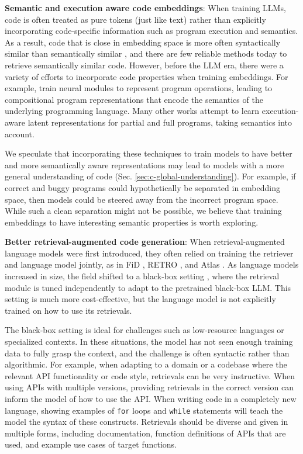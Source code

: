 \textbf{Semantic and execution aware code embeddings}: When training LLMs, code is often treated as pure tokens (just like text) rather than explicitly incorporating code-specific information such as program execution and semantics. As a result, code that is close in embedding space is more often syntactically similar than semantically similar \citep{utpala2023language, zhao2023get}, and there are few reliable methods today to retrieve semantically similar code. However, before the LLM era, there were a variety of efforts to incorporate code properties when training embeddings. For example, \citet{nye2020representing} train neural modules to represent program operations, leading to compositional program representations that encode the semantics of the underlying programming language. Many other works \citep{zohar2018automatic, ellis2019write, chen2021latent} attempt to learn execution-aware latent representations for partial and full programs, taking semantics into account. 

We speculate that incorporating these techniques to train models to have better and more semantically aware representations may lead to models with a more general understanding of code (Sec. \ref{sec:c-global-understanding}). For example, if correct and buggy programs could hypothetically be separated in embedding space, then models could be steered away from the incorrect program space. While such a clean separation might not be possible, we believe that training embeddings to have interesting semantic properties is worth exploring.

\textbf{Better retrieval-augmented code generation}: When retrieval-augmented language models were first introduced, they often relied on training the retriever and language model jointly, as in FiD \citep{izacard2020leveraging}, RETRO \citep{borgeaud2022improving}, and Atlas \citep{izacard2023atlas}. As language models increased in size, the field shifted to a black-box setting \citep{shi2023replug}, where the retrieval module is tuned independently to adapt to the pretrained black-box LLM. This setting is much more cost-effective, but the language model is not explicitly trained on how to use its retrievals.

The black-box setting is ideal for challenges such as low-resource languages or specialized contexts. In these situations, the model has not seen enough training data to fully grasp the context, and the challenge is often syntactic rather than algorithmic. For example, when adapting to a domain or a codebase where the relevant API functionality or code style, retrievals can be very instructive. When using APIs with multiple versions, providing retrievals in the correct version can inform the model of how to use the API. When writing code in a completely new language, showing examples of \texttt{for} loops and \texttt{while} statements will teach the model the syntax of these constructs. Retrievals should be diverse and given in multiple forms, including documentation, function definitions of APIs that are used, and example use cases of target functions.

